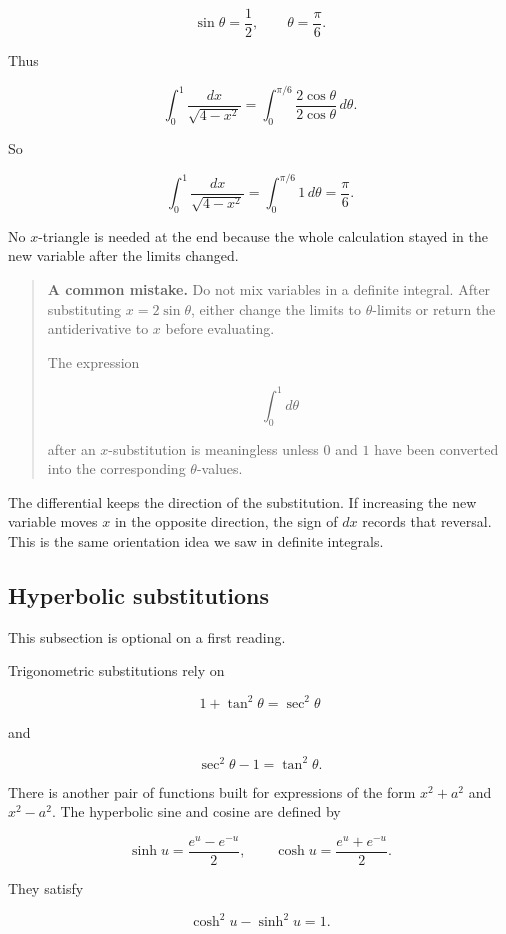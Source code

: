 \[
\sin\theta=\frac12,
\qquad
\theta=\frac{\pi}{6}.
\]

Thus

\[
\int_0^1 \frac{dx}{\sqrt{4-x^2}}
=
\int_0^{\pi/6}
\frac{2\cos\theta}{2\cos\theta}\,d\theta.
\]

So

\[
\int_0^1 \frac{dx}{\sqrt{4-x^2}}
=
\int_0^{\pi/6}1\,d\theta
=
\boxed{\frac{\pi}{6}}.
\]

No \(x\)-triangle is needed at the end because the whole calculation stayed in the new
variable after the limits changed.

\begin{quote}
\textbf{A common mistake.}
Do not mix variables in a definite integral.  After substituting \(x=2\sin\theta\), either
change the limits to \(\theta\)-limits or return the antiderivative to \(x\) before evaluating.

The expression

\[
\int_0^1 d\theta
\]

after an \(x\)-substitution is meaningless unless \(0\) and \(1\) have been converted into
the corresponding \(\theta\)-values.
\end{quote}

The differential keeps the direction of the substitution.  If increasing the new variable
moves \(x\) in the opposite direction, the sign of \(dx\) records that reversal.  This is the
same orientation idea we saw in definite integrals.

\subsection{Hyperbolic substitutions}
\label{subsec:hyperbolic-substitutions}

This subsection is optional on a first reading.

Trigonometric substitutions rely on

\[
1+\tan^2\theta=\sec^2\theta
\]

and

\[
\sec^2\theta-1=\tan^2\theta.
\]

There is another pair of functions built for expressions of the form \(x^2+a^2\) and
\(x^2-a^2\).  The hyperbolic sine and cosine are defined by

\[
\sinh u=\frac{e^u-e^{-u}}{2},
\qquad
\cosh u=\frac{e^u+e^{-u}}{2}.
\]

They satisfy

\[
\cosh^2u-\sinh^2u=1.
\]

